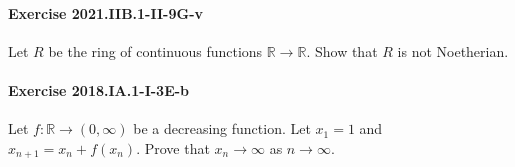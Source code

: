 \documentclass{article}
\begin{document}
\paragraph{Exercise 2021.IIB.1-II-9G-v} Let $R$ be the ring of continuous functions $\mathbb{R}\to\mathbb{R}$. Show that $R$ is not Noetherian. 

\paragraph{Exercise 2018.IA.1-I-3E-b} Let $f: \mathbb{R} \rightarrow(0, \infty)$ be a decreasing function. Let $x_{1}=1$ and $x_{n+1}=x_{n}+f\left(x_{n}\right)$. Prove that $x_{n} \rightarrow \infty$ as $n \rightarrow \infty$.
\end{document}
